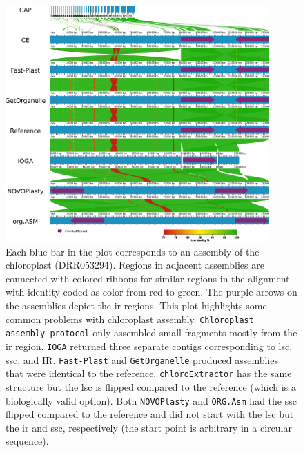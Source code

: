 \documentclass{bmcart}
\newcommand{\formatprogramnames}[1]{\texttt{#1}}
\newcommand{\ce}{\formatprogramnames{chloroExtractor}}
\newcommand{\oa}{\formatprogramnames{ORG.Asm}}
\newcommand{\fp}{\formatprogramnames{Fast-Plast}}
\newcommand{\ioga}{\formatprogramnames{IOGA}}
\newcommand{\np}{\formatprogramnames{NOVOPlasty}}
\newcommand{\go}{\formatprogramnames{GetOrganelle}}
\newcommand{\cassp}{\formatprogramnames{Chloroplast assembly protocol}}
\begin{document}
\begin{backmatter}
\begin{figure}[h!]
  \centering
  \includegraphics[width=0.9\textwidth]{AliTV.png}
  \caption{ Each blue bar in the plot corresponds to an assembly of the  chloroplast (DRR053294). Regions in adjacent assemblies are connected with colored ribbons for similar regions in the alignment with identity coded as color from red to green. The purple arrows on the assemblies depict the \gls{ir} regions. This plot highlights some common problems with chloroplast assembly. \cassp{} only assembled small fragments mostly from the \gls{ir} region. \ioga{} returned three separate contigs corresponding to \gls{lsc}, \gls{ssc}, and IR. \fp{} and \go{} produced assemblies that were identical to the reference. \ce{} has the same structure but the \gls{lsc} is flipped compared to the reference (which is a biologically valid option). Both \np{} and \oa{} had the \gls{ssc} flipped compared to the reference and did not start with the \gls{lsc} but the \gls{ir} and \gls{ssc}, respectively (the start point is arbitrary in a circular sequence).%
      }
      \label{fig:alitv}
      \end{figure}


\end{backmatter}
\end{document}
